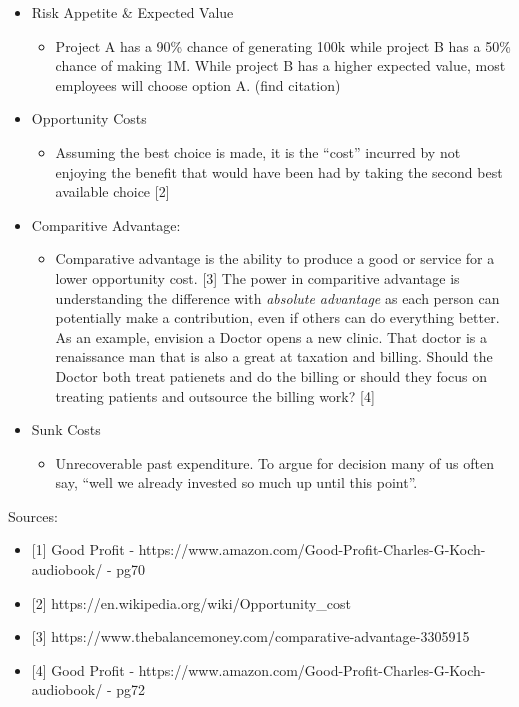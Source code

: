 \documentclass[
  letterpaper,
  DIV=11,
  numbers=noendperiod]{scrreprt}
\providecommand{\tightlist}{%
  \setlength{\itemsep}{0pt}\setlength{\parskip}{0pt}}\usepackage{longtable,booktabs,array}
\begin{document}
\begin{itemize}
\tightlist
\item
  Risk Appetite \& Expected Value

  \begin{itemize}
  \tightlist
  \item
    Project A has a 90\% chance of generating 100k while project B has a
    50\% chance of making 1M. While project B has a higher expected
    value, most employees will choose option A. (find citation)
  \end{itemize}
\item
  Opportunity Costs

  \begin{itemize}
  \tightlist
  \item
    Assuming the best choice is made, it is the ``cost'' incurred by not
    enjoying the benefit that would have been had by taking the second
    best available choice {[}2{]}
  \end{itemize}
\item
  Comparitive Advantage:

  \begin{itemize}
  \tightlist
  \item
    Comparative advantage is the ability to produce a good or service
    for a lower opportunity cost. {[}3{]} The power in comparitive
    advantage is understanding the difference with \emph{absolute
    advantage} as each person can potentially make a contribution, even
    if others can do everything better. As an example, envision a Doctor
    opens a new clinic. That doctor is a renaissance man that is also a
    great at taxation and billing. Should the Doctor both treat
    patienets and do the billing or should they focus on treating
    patients and outsource the billing work? {[}4{]}
  \end{itemize}
\item
  Sunk Costs

  \begin{itemize}
  \tightlist
  \item
    Unrecoverable past expenditure. To argue for decision many of us
    often say, ``well we already invested so much up until this point''.
  \end{itemize}
\end{itemize}

Sources:

\begin{itemize}
\tightlist
\item
  {[}1{]} Good Profit -
  https://www.amazon.com/Good-Profit-Charles-G-Koch-audiobook/ - pg70
\item
  {[}2{]} https://en.wikipedia.org/wiki/Opportunity\_cost
\item
  {[}3{]} https://www.thebalancemoney.com/comparative-advantage-3305915
\item
  {[}4{]} Good Profit -
  https://www.amazon.com/Good-Profit-Charles-G-Koch-audiobook/ - pg72
\end{itemize}
\end{document}
